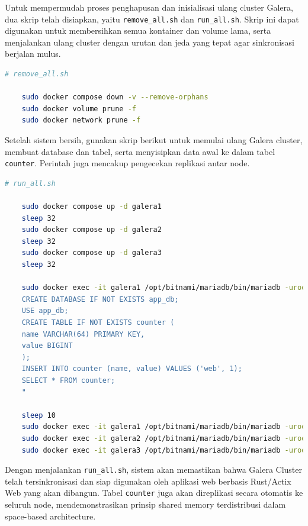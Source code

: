 Untuk mempermudah proses penghapusan dan inisialisasi ulang cluster Galera, dua skrip telah disiapkan, yaitu \texttt{remove\_all.sh} dan \texttt{run\_all.sh}. Skrip ini dapat digunakan untuk membersihkan semua kontainer dan volume lama, serta menjalankan ulang cluster dengan urutan dan jeda yang tepat agar sinkronisasi berjalan mulus.

\begin{lstlisting}[language=bash, caption={Skrip untuk menghapus seluruh kontainer, volume, dan jaringan Docker yang digunakan}, label={lst:remove-all}]
	# remove_all.sh
	
	sudo docker compose down -v --remove-orphans
	sudo docker volume prune -f
	sudo docker network prune -f
\end{lstlisting}

Setelah sistem bersih, gunakan skrip berikut untuk memulai ulang Galera cluster, membuat database dan tabel, serta menyisipkan data awal ke dalam tabel \texttt{counter}. Perintah juga mencakup pengecekan replikasi antar node.

\begin{lstlisting}[language=bash, caption={Skrip untuk menjalankan Galera cluster dan menginisialisasi database}, label={lst:run-all}, basicstyle=\scriptsize\ttfamily]
	# run_all.sh
	
	sudo docker compose up -d galera1
	sleep 32
	sudo docker compose up -d galera2
	sleep 32
	sudo docker compose up -d galera3
	sleep 32
	
	sudo docker exec -it galera1 /opt/bitnami/mariadb/bin/mariadb -uroot -proot -e "
	CREATE DATABASE IF NOT EXISTS app_db;
	USE app_db;
	CREATE TABLE IF NOT EXISTS counter (
	name VARCHAR(64) PRIMARY KEY,
	value BIGINT
	);
	INSERT INTO counter (name, value) VALUES ('web', 1);
	SELECT * FROM counter;
	"
	
	sleep 10
	sudo docker exec -it galera1 /opt/bitnami/mariadb/bin/mariadb -uroot -proot -e "USE app_db; SELECT * FROM counter;"
	sudo docker exec -it galera2 /opt/bitnami/mariadb/bin/mariadb -uroot -proot -e "USE app_db; SELECT * FROM counter;"
	sudo docker exec -it galera3 /opt/bitnami/mariadb/bin/mariadb -uroot -proot -e "USE app_db; SELECT * FROM counter;"
\end{lstlisting}

Dengan menjalankan \texttt{run\_all.sh}, sistem akan memastikan bahwa Galera Cluster telah tersinkronisasi dan siap digunakan oleh aplikasi web berbasis Rust/Actix Web yang akan dibangun. Tabel \texttt{counter} juga akan direplikasi secara otomatis ke seluruh node, mendemonstrasikan prinsip shared memory terdistribusi dalam space-based architecture.


